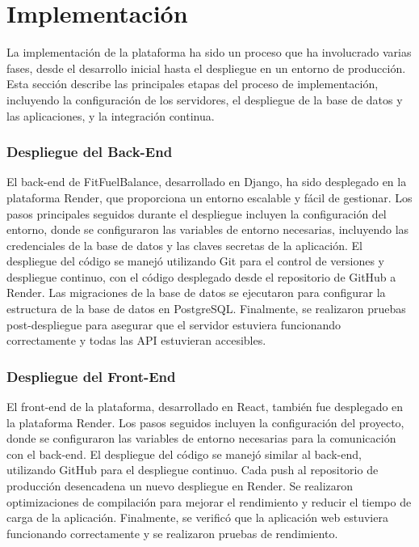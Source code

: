 \section{Implementación}

La implementación de la plataforma ha sido un proceso que ha involucrado varias fases, desde el desarrollo inicial hasta el despliegue en un entorno de producción. Esta sección describe las principales etapas del proceso de implementación, incluyendo la configuración de los servidores, el despliegue de la base de datos y las aplicaciones, y la integración continua.

\subsubsection{Despliegue del Back-End}
El back-end de FitFuelBalance, desarrollado en Django, ha sido desplegado en la plataforma Render, que proporciona un entorno escalable y fácil de gestionar. Los pasos principales seguidos durante el despliegue incluyen la configuración del entorno, donde se configuraron las variables de entorno necesarias, incluyendo las credenciales de la base de datos y las claves secretas de la aplicación. El despliegue del código se manejó utilizando Git para el control de versiones y despliegue continuo, con el código desplegado desde el repositorio de GitHub a Render. Las migraciones de la base de datos se ejecutaron para configurar la estructura de la base de datos en PostgreSQL. Finalmente, se realizaron pruebas post-despliegue para asegurar que el servidor estuviera funcionando correctamente y todas las API estuvieran accesibles.

\subsubsection{Despliegue del Front-End}
El front-end de la plataforma, desarrollado en React, también fue desplegado en la plataforma Render. Los pasos seguidos incluyen la configuración del proyecto, donde se configuraron las variables de entorno necesarias para la comunicación con el back-end. El despliegue del código se manejó similar al back-end, utilizando GitHub para el despliegue continuo. Cada push al repositorio de producción desencadena un nuevo despliegue en Render. Se realizaron optimizaciones de compilación para mejorar el rendimiento y reducir el tiempo de carga de la aplicación. Finalmente, se verificó que la aplicación web estuviera funcionando correctamente y se realizaron pruebas de rendimiento.
